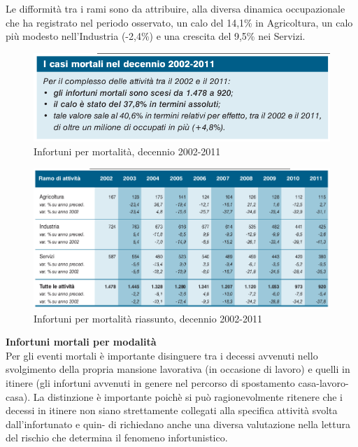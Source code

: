 Le difformità tra i rami sono da attribuire, alla diversa dinamica occupazionale che ha registrato nel periodo osservato, un calo del 14,1\% in Agricoltura, un calo più modesto nell’Industria (-2,4\%) e una crescita del 9,5\% nei Servizi.



\begin{figure}[H]
\centering
\includegraphics[scale=0.5]{images/cap4/analisiDiMercato/infortuniDecennioPerMortalita1}
\caption{Infortuni per mortalità, decennio 2002-2011}
\end{figure}

\begin{figure}[H]
\centering
\includegraphics[scale=0.55]{images/cap4/analisiDiMercato/infortuniDecennioPerMortalita2}
\caption{Infortuni per mortalità riassunto, decennio 2002-2011}
\end{figure}





\textbf{Infortuni mortali per modalità}\\
Per gli eventi mortali è importante disinguere tra i decessi avvenuti nello
svolgimento della propria mansione lavorativa (in occasione di lavoro) e quelli in itinere
(gli infortuni avvenuti in genere nel percorso di spostamento casa-lavoro-casa).
La distinzione è importante poichè si può ragionevolmente ritenere che i decessi in
itinere non siano strettamente collegati alla specifica attività svolta dall’infortunato e quin-
di richiedano anche una diversa valutazione nella lettura del rischio che determina il
fenomeno infortunistico.



